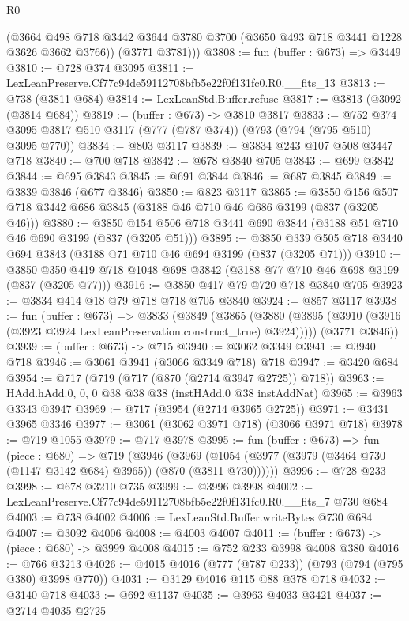\begin{lexlean}{R0}
\begin{coremodule}
        (@3664 @498 @718 @3442 @3644 @3780 @3700 (@3650 @493 @718 @3441 @1228 @3626 @3662 @3766))
        (@3771 @3781)))
@3808 := fun (buffer : @673) => @3449
@3810 := @728 @374 @3095
@3811 := LexLeanPreserve.Cf77c94de59112708bfb5e22f0f131fc0.R0.__fits_13
@3813 := @738 (@3811 @684)
@3814 := LexLeanStd.Buffer.refuse
@3817 := @3813 (@3092 (@3814 @684))
@3819 := (buffer : @673) -> @3810 @3817
@3833 := @752 @374 @3095 @3817 @510 @3117 (@777 (@787 @374)) (@793 (@794 (@795 @510) @3095 @770))
@3834 := @803 @3117
@3839 := @3834 @243 @107 @508 @3447 @718
@3840 := @700 @718
@3842 := @678 @3840 @705
@3843 := @699 @3842
@3844 := @695 @3843
@3845 := @691 @3844
@3846 := @687 @3845
@3849 := @3839 @3846 (@677 @3846)
@3850 := @823 @3117
@3865 := @3850 @156 @507 @718 @3442 @686 @3845 (@3188 @46 @710 @46 @686 @3199 (@837 (@3205 @46)))
@3880 := @3850 @154 @506 @718 @3441 @690 @3844 (@3188 @51 @710 @46 @690 @3199 (@837 (@3205 @51)))
@3895 := @3850 @339 @505 @718 @3440 @694 @3843 (@3188 @71 @710 @46 @694 @3199 (@837 (@3205 @71)))
@3910 := @3850 @350 @419 @718 @1048 @698 @3842 (@3188 @77 @710 @46 @698 @3199 (@837 (@3205 @77)))
@3916 := @3850 @417 @79 @720 @718 @3840 @705
@3923 := @3834 @414 @18 @79 @718 @718 @705 @3840
@3924 := @857 @3117
@3938 := fun (buffer : @673) =>
  @3833
    (@3849
      (@3865 (@3880 (@3895 (@3910 (@3916 (@3923 @3924 LexLeanPreservation.construct_true) @3924)))))
      (@3771 @3846))
@3939 := (buffer : @673) -> @715
@3940 := @3062 @3349
@3941 := @3940 @718
@3946 := @3061 @3941 (@3066 @3349 @718) @718
@3947 := @3420 @684
@3954 := @717 (@719 (@717 (@870 (@2714 @3947 @2725)) @718))
@3963 := HAdd.hAdd.{0, 0, 0} @38 @38 @38 (instHAdd.{0} @38 instAddNat)
@3965 := @3963 @3343 @3947
@3969 := @717 (@3954 (@2714 @3965 @2725))
@3971 := @3431 @3965 @3346
@3977 := @3061 (@3062 @3971 @718) (@3066 @3971 @718)
@3978 := @719 @1055
@3979 := @717 @3978
@3995 := fun (buffer : @673) =>
  fun (piece : @680) =>
  @719
    (@3946
      (@3969 (@1054 (@3977 (@3979 (@3464 @730 (@1147 @3142 @684) @3965)) (@870 (@3811 @730))))))
@3996 := @728 @233
@3998 := @678 @3210 @735
@3999 := @3996 @3998
@4002 := LexLeanPreserve.Cf77c94de59112708bfb5e22f0f131fc0.R0.__fits_7 @730 @684
@4003 := @738 @4002
@4006 := LexLeanStd.Buffer.writeBytes @730 @684
@4007 := @3092 @4006
@4008 := @4003 @4007
@4011 := (buffer : @673) -> (piece : @680) -> @3999 @4008
@4015 := @752 @233 @3998 @4008 @380
@4016 := @766 @3213
@4026 := @4015 @4016 (@777 (@787 @233)) (@793 (@794 (@795 @380) @3998 @770))
@4031 := @3129 @4016 @115 @88 @378 @718
@4032 := @3140 @718
@4033 := @692 @1137
@4035 := @3963 @4033 @3421
@4037 := @2714 @4035 @2725

\end{coremodule}
\end{lexlean}
